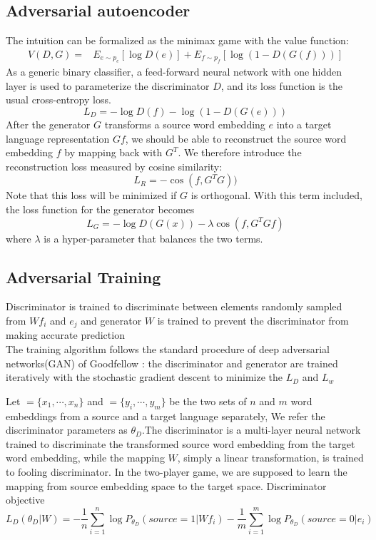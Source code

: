\subsection{Adversarial autoencoder}
The intuition can be formalized as the minimax game with the value function:
\begin{align*}
	V(D, G) = & E_{e\sim {p_e}}[\log D(e)] + E_{f \sim {p_f}} [\log (1-D(G(f)))]
\end{align*}
As a generic binary classifier, a feed-forward neural network with one hidden layer is used to parameterize the discriminator $D$, and its loss function is the usual cross-entropy loss.
\[L_D = -\log D(f) - \log (1-D(G(e)))\]
After the generator $G$ transforms a source word embedding $e$ into a target language representation $Gf$, we should be able to reconstruct the source word embedding $f$ by mapping back with $G^T$. We therefore introduce the reconstruction loss measured by cosine similarity:
\[ L_R = -\cos (f, G^TG))\]
Note that this loss will be minimized if $G$ is orthogonal. With this term included, the loss function for the generator becomes
\[ L_G = -\log D(G(x)) - \lambda \cos(f, G^TGf)\]
where $\lambda$ is a hyper-parameter that balances the two terms. 
\subsection{Adversarial Training}
Discriminator is trained to discriminate between elements randomly sampled from ${Wf_i}$ and ${e_j}$ and generator ${W}$ is trained to prevent the discriminator from making accurate prediction\\

The training algorithm follows the standard procedure of deep adversarial networks(GAN) of Goodfellow \cite{bibid}: the discriminator and generator are trained iteratively with the stochastic gradient descent to minimize the ${L_D}$ and ${L_w}$

Let ${=\{ x_1, \cdots, x_n\}}$ and ${ = \{ y_i, \cdots , y_m\}}$ be the two sets of $n$ and $m$ word embeddings from a source and a target language separately, We refer the discriminator parameters as ${\theta_D}$.The discriminator is a multi-layer neural network trained to discriminate the transformed source word embedding from the target word embedding, while the mapping $W$, simply a linear transformation, is trained to fooling discriminator. In the two-player game, we are supposed to learn the mapping from source embedding space to the target space.
Discriminator objective  
\[ L_D(\theta_D | W) =  -\frac{1}{n} \sum_{i=1}^{n} \log P_{\theta_D}(source = 1| Wf_i) - \frac{1}{m} \sum_{i=1}^{m} \log P_{\theta_D}(source=0| e_i) \]	


